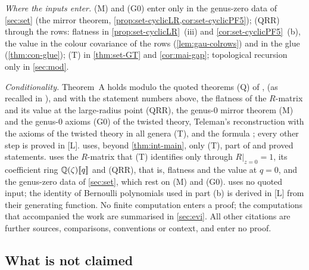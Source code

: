 \emph{Where the inputs enter.} (M) and (G0) enter only in the genus-zero data of \cref{sec:set} (the mirror theorem, \cref{prop:set-cyclicLR,cor:set-cyclicPF5}); (QRR) through the rows: flatness in \cref{prop:set-cyclicLR}~(iii) and \cref{cor:set-cyclicPF5}~(b), the value in the colour covariance of the rows (\cref{lem:gau-colrows}) and in the glue (\cref{thm:con-glue}); (T) in \cref{thm:set-GT} and \cref{cor:mai-gap}; topological recursion only in \cref{sec:mod}. 

\emph{Conditionality.} Theorem~A holds modulo the quoted theorems (Q) of \cite{Eynard:2007kz}, \cite{DuninBarkowski:2012bw} (as recalled in \cite{Dunin-Barkowski:2015caa}), \cite{ABDKS25} and \cite{PPZ15} with the statement numbers above, the flatness of the $R$-matrix and its value at the large-radius point (QRR), the genus-$0$ mirror theorem (M) and the genus-$0$ axioms (G0) of the twisted theory, Teleman's reconstruction with the axioms of the twisted theory in all genera (T), and the formula \cite[(1.7)]{AC96}; every other step is proved in [L].  uses, beyond \cref{thm:int-main}, only (T), part of \cite{PPZ15} and proved statements.  uses the $R$-matrix that (T) identifies only through $R|_{z=0}=1$, its coefficient ring $\mathbb{Q}(\zeta)[\![ q ]\!]$ and (QRR), that is, flatness and the value at $q=0$, and the genus-zero data of \cref{sec:set}, which rest on (M) and (G0).  uses no quoted input; the identity \cite[24.4.1]{DLMF} of Bernoulli polynomials used in part (b) is derived in [L] from their generating function. No finite computation enters a proof; the computations that accompanied the work are summarised in \cref{sec:evi}. All other citations are further sources, comparisons, conventions or context, and enter no proof.

\subsection{What is not claimed}
\label{sec:int-notclaimed}

